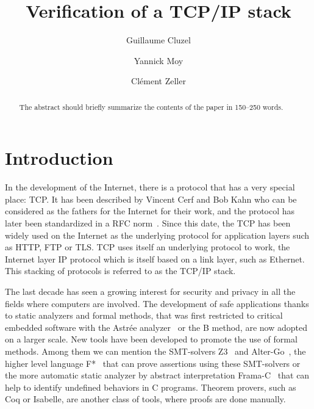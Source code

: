 \documentclass[runningheads]{llncs}
\title{Verification of a TCP/IP stack}
\author{Guillaume Cluzel\inst{1,2} \and
        Yannick Moy\inst{1} \and
        Clément Zeller\inst{3}}
\institute{Adacore \and
        École Normale Supérieure de Lyon \and
        Oryx Embedded}
\begin{document}
        

\maketitle

\begin{abstract}
    The abstract should briefly summarize the contents of the paper in
    150--250 words.
    
\end{abstract}

\section{Introduction}

    In the development of the Internet, there is a protocol that has a very special place: TCP.
    It has been described by Vincent Cerf and Bob Kahn who can be considered as the fathers for the Internet
    for their work, and the protocol has later been standardized in a RFC norm~\cite{rfc793}.
    Since this date, the TCP has been widely used on the Internet as the underlying protocol for application layers such as HTTP,
    FTP or TLS. TCP uses itself an underlying protocol to work, the Internet layer IP protocol which is itself
    based on a link layer, such as Ethernet. This stacking of protocols is referred to as the TCP/IP stack.

    The last decade has seen a growing interest for security and privacy in all the fields where computers are
    involved. The development of safe applications thanks to static analyzers and formal methods, that was first
    restricted to critical embedded software with the Astrée analyzer~\cite{cousot2005astree} or the B method, are
    now adopted on a larger scale. New tools have been developed to promote the use of formal methods. Among them we
    can mention the SMT-solvers Z3~\cite{de2008z3} and Alter-Go~\cite{conchon:hal-01960203},
    the higher level language F*~\cite{mumon} that can prove assertions
    using these SMT-solvers or the more automatic static analyzer by abstract interpretation Frama-C~\cite{cuoq2012frama}
    that can help to identify undefined behaviors in C programs. Theorem provers, such as Coq or Isabelle, are another class
    of tools, where proofs are done manually.
\end{document}
